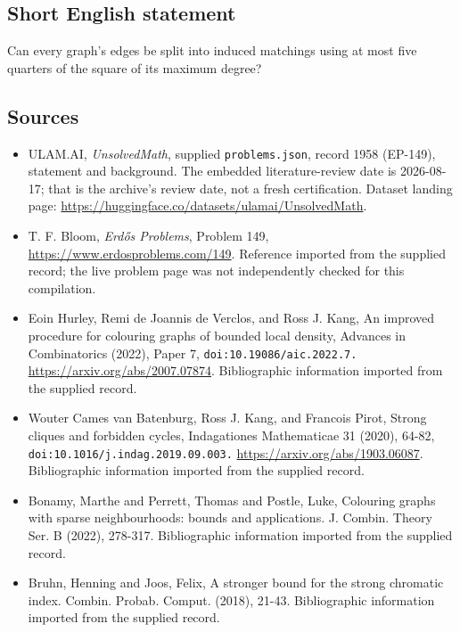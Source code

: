 \documentclass[11pt,a4paper]{article}
\begin{document}
\subsection{Short English statement}

Can every graph's edges be split into induced matchings using at most five quarters of the square of its maximum degree?

\subsection{Sources}

{\small

\begin{itemize}

\item[\hypertarget{source:1958:1}{S1}] ULAM.AI, \emph{UnsolvedMath}, supplied \texttt{problems.json}, record 1958 (EP-149), statement and background. The embedded literature-review date is 2026-08-17; that is the archive’s review date, not a fresh certification. Dataset landing page: \url{https://huggingface.co/datasets/ulamai/UnsolvedMath}.

\item[\hypertarget{source:1958:2}{S2}] T. F. Bloom, \emph{Erdős Problems}, Problem 149, \url{https://www.erdosproblems.com/149}. Reference imported from the supplied record; the live problem page was not independently checked for this compilation.

\item[\hypertarget{source:1958:3}{S3}] Eoin Hurley, Remi de Joannis de Verclos, and Ross J. Kang, An improved procedure for colouring graphs of bounded local density, Advances in Combinatorics (2022), Paper 7, \nolinkurl{doi:10.19086/aic.2022.7.} \url{https://arxiv.org/abs/2007.07874}. Bibliographic information imported from the supplied record.

\item[\hypertarget{source:1958:4}{S4}] Wouter Cames van Batenburg, Ross J. Kang, and Francois Pirot, Strong cliques and forbidden cycles, Indagationes Mathematicae 31 (2020), 64-82, \nolinkurl{doi:10.1016/j.indag.2019.09.003.} \url{https://arxiv.org/abs/1903.06087}. Bibliographic information imported from the supplied record.

\item[\hypertarget{source:1958:5}{S5}] Bonamy, Marthe and Perrett, Thomas and Postle, Luke, Colouring graphs with sparse neighbourhoods: bounds and applications. J. Combin. Theory Ser. B (2022), 278-317. Bibliographic information imported from the supplied record.

\item[\hypertarget{source:1958:6}{S6}] Bruhn, Henning and Joos, Felix, A stronger bound for the strong chromatic index. Combin. Probab. Comput. (2018), 21-43. Bibliographic information imported from the supplied record.

\end{itemize}

}

\label{end:1958}
\end{document}
